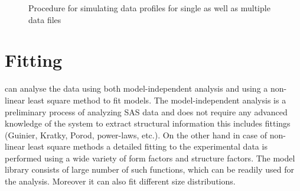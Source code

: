 \begin{figure}[htb]
\centering
\caption{Procedure for simulating data profiles for single as well as multiple data files}
\label{fig:QTsimulateDS}
\end{figure}

\section{Fitting}
\SASfit can analyse the data using both model-independent analysis
and using a non-linear least square method to fit models. The
model-independent analysis is a preliminary process of analyzing SAS
data and does not require any advanced knowledge of the system to
extract structural information this includes fittings (Guinier,
Kratky, Porod, power-laws, etc.). On the other hand in case of
non-linear least square methods a detailed fitting to the
experimental data is performed using a wide variety of form factors
and structure factors. The \SASfit model library consists of large
number of such functions, which can be readily used for the
analysis. Moreover it can also fit different size distributions.

